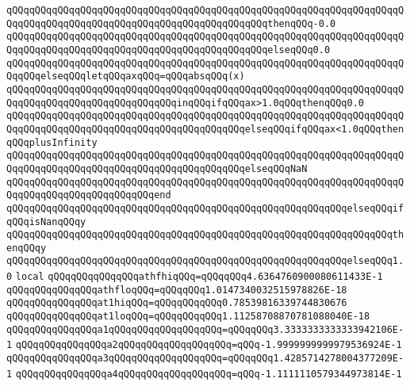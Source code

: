 \verb|qQQqqQQqqQQqqQQqqQQqqQQqqQQqqQQqqQQqqQQqqQQqqQQqqQQqqQQqqQQqqQQqqQQqqQQqqQQqqQQqqQQqqQQqqQQqqQQqqQQqqQQqqQQqqQQqqQQqthenqQQq-0.0|\newline
\verb|qQQqqQQqqQQqqQQqqQQqqQQqqQQqqQQqqQQqqQQqqQQqqQQqqQQqqQQqqQQqqQQqqQQqqQQqqQQqqQQqqQQqqQQqqQQqqQQqqQQqqQQqqQQqqQQqqQQqelseqQQq0.0|\newline
\verb|qQQqqQQqqQQqqQQqqQQqqQQqqQQqqQQqqQQqqQQqqQQqqQQqqQQqqQQqqQQqqQQqqQQqqQQqqQQqelseqQQqletqQQqaxqQQq=qQQqabsqQQq(x)|\newline
\verb|qQQqqQQqqQQqqQQqqQQqqQQqqQQqqQQqqQQqqQQqqQQqqQQqqQQqqQQqqQQqqQQqqQQqqQQqqQQqqQQqqQQqqQQqqQQqqQQqqQQqinqQQqifqQQqax>1.0qQQqthenqQQq0.0|\newline
\verb|qQQqqQQqqQQqqQQqqQQqqQQqqQQqqQQqqQQqqQQqqQQqqQQqqQQqqQQqqQQqqQQqqQQqqQQqqQQqqQQqqQQqqQQqqQQqqQQqqQQqqQQqqQQqqQQqelseqQQqifqQQqax<1.0qQQqthenqQQqplusInfinity|\newline
\verb|qQQqqQQqqQQqqQQqqQQqqQQqqQQqqQQqqQQqqQQqqQQqqQQqqQQqqQQqqQQqqQQqqQQqqQQqqQQqqQQqqQQqqQQqqQQqqQQqqQQqqQQqqQQqqQQqelseqQQqNaN|\newline
\verb|qQQqqQQqqQQqqQQqqQQqqQQqqQQqqQQqqQQqqQQqqQQqqQQqqQQqqQQqqQQqqQQqqQQqqQQqqQQqqQQqqQQqqQQqqQQqqQQqend|\newline
\verb|qQQqqQQqqQQqqQQqqQQqqQQqqQQqqQQqqQQqqQQqqQQqqQQqqQQqqQQqqQQqelseqQQqifqQQqisNanqQQqy|\newline
\verb|qQQqqQQqqQQqqQQqqQQqqQQqqQQqqQQqqQQqqQQqqQQqqQQqqQQqqQQqqQQqqQQqqQQqthenqQQqy|\newline
\verb|qQQqqQQqqQQqqQQqqQQqqQQqqQQqqQQqqQQqqQQqqQQqqQQqqQQqqQQqqQQqelseqQQq1.0|\newline
\verb|local|\newline
\verb|qQQqqQQqqQQqqQQqathfhiqQQq=qQQqqQQq4.6364760900080611433E-1|\newline
\verb|qQQqqQQqqQQqqQQqathfloqQQq=qQQqqQQq1.0147340032515978826E-18|\newline
\verb|qQQqqQQqqQQqqQQqat1hiqQQq=qQQqqQQqqQQq0.78539816339744830676|\newline
\verb|qQQqqQQqqQQqqQQqat1loqQQq=qQQqqQQqqQQq1.11258708870781088040E-18|\newline
\verb|qQQqqQQqqQQqqQQqa1qQQqqQQqqQQqqQQqqQQq=qQQqqQQq3.3333333333333942106E-1|\newline
\verb|qQQqqQQqqQQqqQQqa2qQQqqQQqqQQqqQQqqQQq=qQQq-1.9999999999979536924E-1|\newline
\verb|qQQqqQQqqQQqqQQqa3qQQqqQQqqQQqqQQqqQQq=qQQqqQQq1.4285714278004377209E-1|\newline
\verb|qQQqqQQqqQQqqQQqa4qQQqqQQqqQQqqQQqqQQq=qQQq-1.1111110579344973814E-1|\newline
